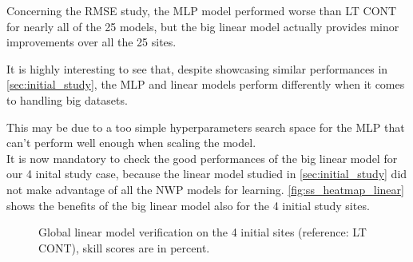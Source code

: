Concerning the RMSE study, the MLP model performed worse than LT CONT for nearly all of the 25 models, but the big linear model actually provides minor improvements over all the 25 sites.

It is highly interesting to see that, despite showcasing similar performances in \ref{sec:initial_study}, the MLP and linear models perform differently when it comes to handling big datasets.

This may be due to a too simple hyperparameters search space for the MLP that can't perform well enough when scaling the model.\\

It is now mandatory to check the good performances of the big linear model for our 4 inital study case, because the linear model studied in \ref{sec:initial_study} did not make advantage of all the NWP models for learning.
\autoref{fig:ss_heatmap_linear} shows the benefits of the big linear model also for the 4 initial study sites.

\begin{figure}[htb!]
    \centering
    
\caption{Global linear model verification on the 4 initial sites (reference: LT CONT), skill scores are in percent.}
\label{fig:ss_heatmap_linear}
\end{figure}